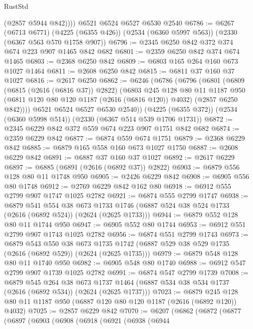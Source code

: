 \begin{lexlean}{RustStd}
\begin{coremodule}
          (@2857 @5944 @842))))
    @6521
    @6524
    @6527
    @6530
    @2540
@6786 := @6267
    (@6713 @6771)
    (@4225 (@6355 @426))
    (@2534 (@6360 @5997 @563))
    (@2330 (@6367 @563 @570 @1758 @907))
@6796 := @2345 @6250 @842 @372 @374 @674 @223 @907 @1465 @842 @682
@6801 := @2359 @6250 @842 @374 @674 @1465
@6803 := @2368 @6250 @842
@6809 := @6803 @165 @264 @160 @673 @1027 @1464
@6811 := @2608 @6250 @842
@6815 := @6811 @37 @160 @37 @1027
@6816 := @2617 @6250
@6862 := @6246
    (@6786
      (@6796
        (@6801
          (@6809
            (@6815 (@2616 (@6816 @37)) @2822)
            (@6803
              @245
              @128
              @80
              @11
              @1187
              @950
              (@6811 @120 @80 @120 @1187 (@2616 (@6816 @120)) @4032)
              (@2857 @6250 @842))))
        @6521
        @6524
        @6527
        @6530
        @2540))
    (@4225 (@6355 @372))
    (@2534 (@6360 @5998 @514))
    (@2330 (@6367 @514 @539 @1706 @1731))
@6872 := @2345 @6229 @842 @372 @559 @674 @223 @907 @1751 @842 @682
@6874 := @2359 @6229 @842
@6877 := @6874 @559 @674 @1751
@6879 := @2368 @6229 @842
@6885 := @6879 @165 @558 @160 @673 @1027 @1750
@6887 := @2608 @6229 @842
@6891 := @6887 @37 @160 @37 @1027
@6892 := @2617 @6229
@6897 := @6885 (@6891 (@2616 (@6892 @37)) @2822)
@6903 := @6879 @556 @128 @80 @11 @1748 @950
@6905 := @2426 @6229 @842
@6908 := @6905 @556 @80 @1748
@6912 := @2769 @6229 @842 @162 @80
@6918 := @6912 @555 @2799 @907 @1747 @1025 @2782
@6921 := @6874 @555 @2799 @1747
@6938 := @6879
    @541
    @554
    @38
    @673
    @1733
    @1746
    (@6887 @524 @38 @524 @1733 (@2616 (@6892 @524)) (@2624 (@2625 @1733)))
@6944 := @6879 @552 @128 @80 @11 @1744 @950
@6947 := @6905 @552 @80 @1744
@6953 := @6912 @551 @2799 @907 @1743 @1025 @2782
@6956 := @6874 @551 @2799 @1743
@6973 := @6879
    @543
    @550
    @38
    @673
    @1735
    @1742
    (@6887 @529 @38 @529 @1735 (@2616 (@6892 @529)) (@2624 (@2625 @1735)))
@6979 := @6879 @548 @128 @80 @11 @1740 @950
@6982 := @6905 @548 @80 @1740
@6988 := @6912 @547 @2799 @907 @1739 @1025 @2782
@6991 := @6874 @547 @2799 @1739
@7008 := @6879
    @545
    @264
    @38
    @673
    @1737
    @1464
    (@6887 @534 @38 @534 @1737 (@2616 (@6892 @534)) (@2624 (@2625 @1737)))
@7023 := @6879 @245 @128 @80 @11 @1187 @950 (@6887 @120 @80 @120 @1187 (@2616 (@6892 @120)) @4032)
@7025 := @2857 @6229 @842
@7070 := @6207
    (@6862
      (@6872
        (@6877
          (@6897
            (@6903
              (@6908
                (@6918
                  (@6921
                    (@6938
                      (@6944

\end{coremodule}
\end{lexlean}
